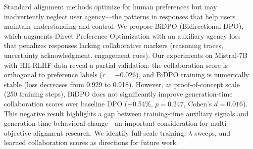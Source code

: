 Standard alignment methods optimize for human preferences but may inadvertently neglect user agency---the patterns in responses that help users maintain understanding and control. We propose BiDPO (Bidirectional DPO), which augments Direct Preference Optimization with an auxiliary agency loss that penalizes responses lacking collaborative markers (reasoning traces, uncertainty acknowledgment, engagement cues). Our experiments on Mistral-7B with HH-RLHF data reveal a partial validation: the collaboration score is orthogonal to preference labels ($r = -0.026$), and BiDPO training is numerically stable (loss decreases from 0.929 to 0.918). However, at proof-of-concept scale (250 training steps), BiDPO does not significantly improve generation-time collaboration scores over baseline DPO (+0.54\%, $p = 0.247$, Cohen's $d = 0.016$). This negative result highlights a gap between training-time auxiliary signals and generation-time behavioral change---an important consideration for multi-objective alignment research. We identify full-scale training, $\lambda$ sweeps, and learned collaboration scores as directions for future work.
